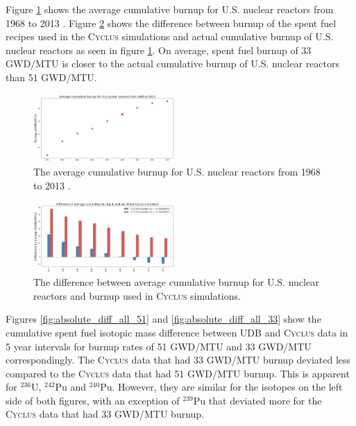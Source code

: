 \documentclass{anstrans}
\newcommand{\Cyclus}{\textsc{Cyclus}\xspace}%
\begin{document}
Figure \ref{fig:burn_up_real} shows the average cumulative burnup for U.S. 
nuclear reactors from 1968 to 2013 \cite{eia_spent_2015}. Figure 
\ref{fig:burn_up_difference} shows the difference between burnup of the spent 
fuel recipes used in the \Cyclus simulations and actual cumulative burnup of U.S. 
nuclear reactors as seen in figure \ref{fig:burn_up_real}. On average, spent 
fuel burnup of 33 GWD/MTU is closer to the actual cumulative burnup of U.S. nuclear 
reactors than 51 GWD/MTU. 

\begin{figure}[t] %
	\centering
	\includegraphics[width=0.48\textwidth]{../figures/burn_up_real}
	\caption{The average cumulative burnup for U.S. nuclear reactors from 1968 to 2013 \cite{eia_spent_2015}.}
	\label{fig:burn_up_real}
\end{figure} 

\begin{figure}[t] %
	\centering
	\includegraphics[width=0.48\textwidth]{../figures/burn_up_difference}
	\caption{The difference between average cumulative burnup for U.S. nuclear reactors and burnup used in \Cyclus simulations.}
	\label{fig:burn_up_difference}
\end{figure} 

Figures \ref{fig:absolute_diff_all_51} and \ref{fig:absolute_diff_all_33} show 
the cumulative spent fuel isotopic mass difference between \gls{UDB} and \Cyclus data 
in 5 year intervals for burnup rates of 51 GWD/MTU and 33 GWD/MTU correspondingly. 
The \Cyclus data that had 33 GWD/MTU burnup deviated less compared to the 
\Cyclus data that had 51 GWD/MTU burnup. This is apparent for $^{236}$U, 
$^{242}$Pu and $^{240}$Pu. However, they are similar for the isotopes on the left side 
of both figures, with an exception of $^{239}$Pu that deviated more for the \Cyclus data that 
had 33 GWD/MTU burnup. 
\end{document}
